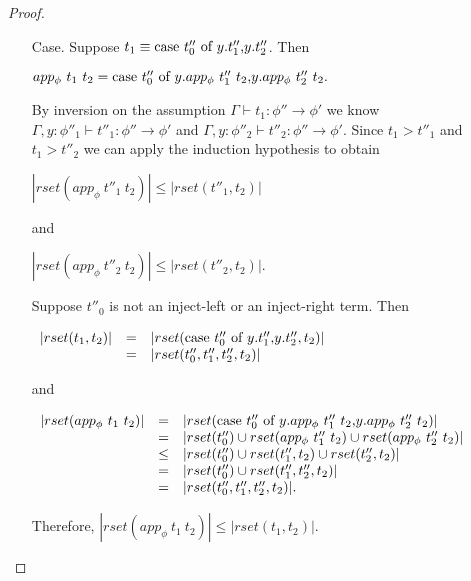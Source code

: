 \begin{proof}
\begin{itemize}
\begin{itemize}
  \item[Case.] Suppose $t_1 \equiv \mbox{case}\ t''_0\ \text{of}\ y\text{.}t''_1\text{,}y\text{.}t''_2$.  Then 
    \begin{center}
      \begin{math}
        app_\phi\ t_1\ t_2 = \mbox{case}\ t''_0\ \text{of}\ y\text{.}app_\phi\ t''_1\ t_2\text{,}y\text{.}app_\phi\ t''_2\ t_2.
      \end{math}
    \end{center}
    By inversion on the assumption $\Gamma \vdash t_1:\phi'' \to \phi'$ we know 
    $\Gamma,y:\phi''_1 \vdash t''_1:\phi'' \to \phi'$ and $\Gamma,y:\phi''_2 \vdash t''_2:\phi'' \to \phi'$.
    Since $t_1 > t''_1$ and $t_1 > t''_2$ we can apply the induction hypothesis to obtain
    \begin{center}
      \begin{math}
        |rset(app_\phi\ t''_1\ t_2)| \leq |rset(t''_1,t_2)|
      \end{math}
    \end{center}
    and
    \begin{center}
      \begin{math}
        |rset(app_\phi\ t''_2\ t_2)| \leq |rset(t''_2,t_2)|.
      \end{math}
    \end{center}
    Suppose $t''_0$ is not an inject-left or an inject-right term.  Then
    \begin{center}
      \begin{math}
        \begin{array}{lll}
          |rset(t_1,t_2)| & = & |rset(\mbox{case}\ t''_0\ \text{of}\ y\text{.}t''_1\text{,}y\text{.}t''_2, t_2)|\\
          & = & |rset(t''_0,t''_1,t''_2,t_2)|
        \end{array}
      \end{math}
    \end{center}
    and
    \begin{center}
      \begin{math}
        \begin{array}{lll}
          |rset(app_\phi\ t_1\ t_2)| & = & |rset(\mbox{case}\ t''_0\ \text{of}\ y\text{.}app_\phi\ t''_1\ t_2\text{,}y\text{.}app_\phi\ t''_2\ t_2)|\\
          & = & |rset(t''_0) \cup rset(app_\phi\ t''_1\ t_2) \cup rset(app_\phi\ t''_2\ t_2)|\\
          & \leq & |rset(t''_0) \cup rset(t''_1, t_2) \cup rset(t''_2, t_2)|\\
          & = & |rset(t''_0) \cup rset(t''_1, t''_2, t_2)|\\
          & = & |rset(t''_0, t''_1, t''_2, t_2)|.
        \end{array}
      \end{math}
    \end{center}
    Therefore, $|rset(app_\phi\ t_1\ t_2)| \leq |rset(t_1,t_2)|$.


\end{itemize}
\end{itemize}
\end{proof}
